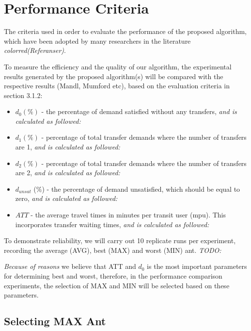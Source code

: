 \section{Performance Criteria}
\label{sec:performanceCriteria}

The criteria used in order to evaluate the performance of the proposed algorithm, which have been adopted by many researchers in the literature \emph{color{red}(Referanser)}.

To measure the efficiency and the quality of our algorithm, the experimental results generated by the proposed algorithm(s) will be compared with the respective results (Mandl, Mumford etc), based on the evaluation criteria in section 3.1.2: 

\begin{itemize}
\item $d_0 (\%)$ - the percentage of demand satisfied without any transfers, \emph{\color{red}and is calculated as followed:}
\item $d_1 (\%)$ - percentage of total transfer demands where the number of transfers are 1, \emph{\color{red}and is calculated as followed:}
\item $d_2 (\%)$ - percentage of total transfer demands where the number of transfers are 2, \emph{\color{red}and is calculated as followed:}
\item $d_{unsat}$ (\%) - the percentage of demand unsatisfied, which should be equal to zero, \emph{\color{red}and is calculated as followed:}
\item $ATT$  - the average travel times in minutes per transit user (mpu). This incorporates transfer waiting times, \emph{\color{red}and is calculated as followed:}
\end{itemize}

To demonstrate reliability, we will carry out 10 replicate runs per experiment, recording the average (AVG), best (MAX) and worst (MIN) ant.  
\emph{\color{red} TODO:}

\emph{\color{red} Because of reasons }we believe that ATT and $d_0$ is the most important parameters for determining best and worst, therefore, in the performance comparison experiments, the selection of MAX and MIN will be selected based on these parameters.

\subsection{Selecting MAX Ant}

